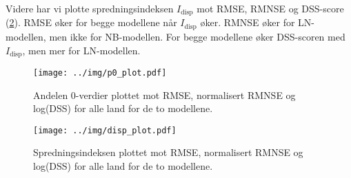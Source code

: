 Videre har vi plotte spredningsindeksen $I_{\mathrm{disp}}$ mot RMSE, RMNSE og
DSS-score (\cref{fig:disp_plot}). RMSE øker for begge modellene når
$I_{\mathrm{disp}}$ øker. RMNSE øker for LN-modellen, men ikke for NB-modellen.
For begge modellene øker DSS-scoren med $I_{\mathrm{disp}}$, men mer for
LN-modellen.

\begin{figure}[!h]
\centering
\texttt{[image: ../img/p0\_plot.pdf]}
\caption{
    Andelen 0-verdier plottet mot RMSE, normalisert RMNSE og log(DSS) for alle
    land for de to modellene.
}
\label{fig:p0_plot}
\end{figure}

\begin{figure}[!h]
\centering
\texttt{[image: ../img/disp\_plot.pdf]}
\caption{
    Spredningsindeksen plottet mot RMSE, normalisert RMNSE og log(DSS) for alle
    land for de to modellene.
}
\label{fig:disp_plot}
\end{figure}

